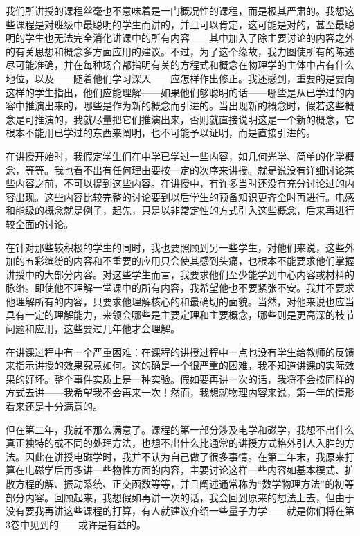 \documentclass[UTF8, 12pt, a4paper, twoside]{ctexbook}
\begin{document}
我们所讲授的课程丝毫也不意味着是一门概况性的课程，而是极其严肃的。我想这些课程是对班级中最聪明的学生而讲的，并且可以肯定，这可能是对的，甚至最聪明的学生也无法完全消化讲课中的所有内容——其中加入了除主要讨论的内容之外的有关思想和概念多方面应用的建议。不过，为了这个缘故，我力图使所有的陈述尽可能准确，并在每种场合都指明有关的方程式和概念在物理学的主体中占有什么地位，以及——随着他们学习深入——应怎样作出修正。我还感到，重要的是要向这样的学生指出，他们应能理解——如果他们够聪明的话——哪些是从已学过的内容中推演出来的，哪些是作为新的概念而引进的。当出现新的概念时，假若这些概念是可推演的，我就尽量把它们推演出来，否则就直接说明这是一个新的概念，它根本不能用已学过的东西来阐明，也不可能予以证明，而是直接引进的。
      
在讲授开始时，我假定学生们在中学已学过一些内容，如几何光学、简单的化学概念，等等。我也看不出有任何理由要按一定的次序来讲授。就是说没有详细讨论某些内容之前，不可以提到这些内容。在讲授中，有许多当时还没有充分讨论过的内容出现。这些内容比较完整的讨论要到以后学生的预备知识更齐全时再进行。电感和能级的概念就是例子，起先，只是以非常定性的方式引入这些概念，后来再进行较全面的讨论。
      
在针对那些较积极的学生的同时，我也要照顾到另一些学生，对他们来说，这些外加的五彩缤纷的内容和不重要的应用只会使其感到头痛，也根本不能要求他们掌握讲授中的大部分内容。对这些学生而言，我要求他们至少能学到中心内容或材料的脉络。即使他不理解一堂课中的所有内容，我希望他也不要紧张不安。我并不要求他理解所有的内容，只要求他理解核心的和最确切的面貌。当然，对他来说也应当具有一定的理解能力，来领会哪些是主要定理和主要概念，哪些则是更高深的枝节问题和应用，这些要过几年他才会理解。

在讲课过程中有一个严重困难：在课程的讲授过程中一点也没有学生给教师的反馈来指示讲授的效果究竟如何。这的确是一个很严重的困难，我不知道讲课的实际效果的好坏。整个事件实质上是一种实验。假如要再讲一次的话，我将不会按同样的方式去讲——我希望我不会再来一次！然而，我想就物理内容来说，第一年的情形看来还是十分满意的。
  
但在第二年，我就不那么满意了。课程的第一部分涉及电学和磁学，我想不出什么真正独特的或不同的处理方法，也想不出什么比通常的讲授方式格外引人入胜的方法。因此在讲授电磁学时，我并不认为自己做了很多事情。在第二年末，我原来打算在电磁学后再多讲一些物性方面的内容，主要讨论这样一些内容如基本模式、扩散方程的解、振动系统、正交函数等等，并且阐述通常称为“数学物理方法”的初等部分内容。回顾起来，我想假如再讲一次的话，我会回到原来的想法上去，但由于没有要我再讲这些课程的打算，有人就建议介绍一些量子力学——就是你们将在第3卷中见到的——或许是有益的。
  
\end{document}
